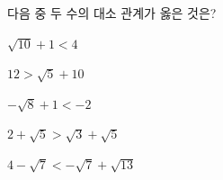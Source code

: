 다음 중 두 수의 대소 관계가 옳은 것은?
\begin{choicesii}{\rule[-3ex]{0pt}{8ex}$\sqrt{10}+1<4$}{\rule[-3ex]{0pt}{8ex}$12>\sqrt{5}+10$}{\rule[-3ex]{0pt}{8ex}$-\sqrt{8}+1<-2$}{\rule[-3ex]{0pt}{8ex}$2+\sqrt{5}>\sqrt{3}+\sqrt{5}$}{\rule[-3ex]{0pt}{8ex}$4-\sqrt{7}<-\sqrt{7}+\sqrt{13}$}\end{choicesii}
